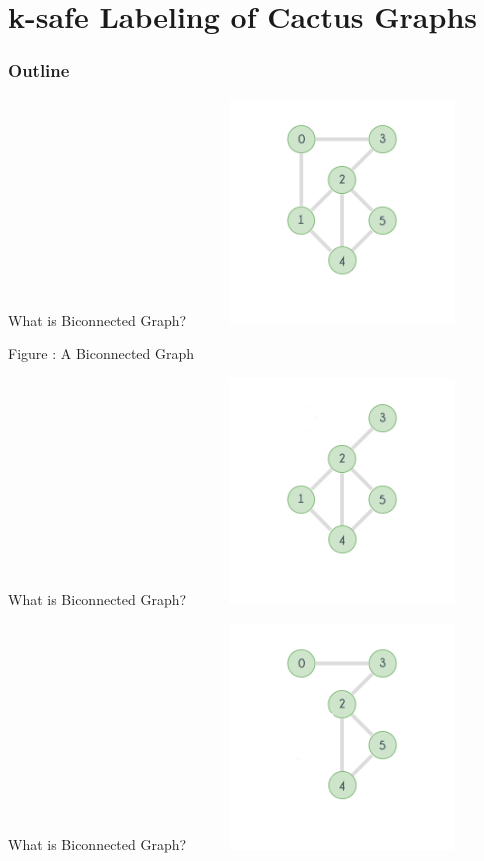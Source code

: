 \documentclass{beamer}
\begin{document}
			\section{k-safe Labeling of Cactus Graphs}
			\begin{frame}
				\frametitle{Outline}
				\tableofcontents[currentsection]
			\end{frame}
			\begin{frame}{What is Biconnected Graph?}
				\centering
				\includegraphics[height=6cm,width=8cm]{bic.png}
				
				Figure : A  Biconnected Graph
			\end{frame}
			\begin{frame}{What is Biconnected Graph?}
				\centering
				\includegraphics[height=6cm,width=8cm]{bic0.png}
			\end{frame}
			\begin{frame}{What is Biconnected Graph?}
				\centering
				\includegraphics[height=6cm,width=8cm]{bic1.png}
			\end{frame}
\end{document}
